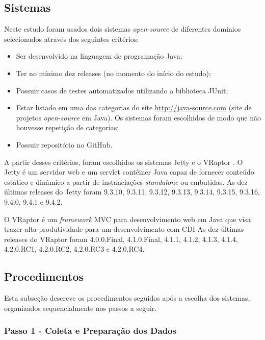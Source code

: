 \subsection{Sistemas} \label{subsec:avaliacao-sistemas}

Neste estudo foram usados dois sistemas \textit{open-source} de diferentes domínios selecionados através dos seguintes critérios:
\begin{itemize}
  \item Ser desenvolvido na linguagem de programação Java;
  \item Ter no mínimo dez releases (no momento do início do estudo);
  \item Possuir casos de testes automatizados utilizando a biblioteca JUnit;
  \item Estar listado em uma das categorias do site \href{http://java-source.com}{http://java-source.com} (site de projetos \textit{open-source} em Java). Os sistemas foram escolhidos de modo que não houvesse repetição de categorias;
  \item Possuir repositório no GitHub.
\end{itemize}

A partir desses critérios, foram escolhidos os sistemas Jetty \cite{Jetty2016} e o VRaptor \cite{VRaptor2017}. O Jetty é um servidor web e um servlet contêiner Java capaz de fornecer conteúdo estático e dinâmico a partir de instanciações \textit{standalone} ou embutidas. As dez últimas releases do Jetty foram 9.3.10, 9.3.11, 9.3.12, 9.3.13, 9.3.14, 9.3.15, 9.3.16, 9.4.0, 9.4.1 e 9.4.2.

O VRaptor é um \textit{framework} MVC para desenvolvimento web em Java que visa trazer alta produtividade para um desenvolvimento com CDI  As dez últimas releases do VRaptor foram 4.0.0.Final, 4.1.0.Final, 4.1.1, 4.1.2, 4.1.3, 4.1.4, 4.2.0.RC1, 4.2.0.RC2, 4.2.0.RC3 e 4.2.0.RC4.

\subsection{Procedimentos} \label{subsec:avaliacao-procedimentos}

Esta subseção descreve os procedimentos seguidos após a escolha dos sistemas, organizados sequencialmente nos passos a seguir.

\subsubsection{Passo 1 - Coleta e Preparação dos Dados} \label{subsec:avaliacao-procedimentos-passo-1}

